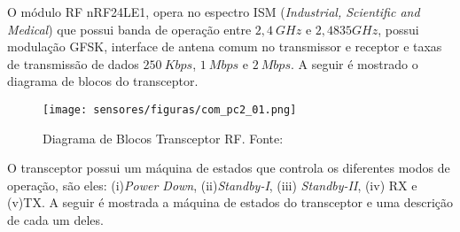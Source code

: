 O módulo RF nRF24LE1, opera no espectro ISM (\emph{Industrial, Scientific and Medical}) que possui banda de operação entre $2,4~GHz$ e $2,4835GHz$, possui modulação GFSK, interface de antena comum no transmissor e receptor e taxas de transmissão de dados $250~Kbps$, $1~Mbps$ e $2~Mbps$. A seguir é mostrado o diagrama de blocos do transceptor.

\begin{figure}[H]
\centering
	\label{com_pc2_01}
	\texttt{[image: sensores/figuras/com\_pc2\_01.png]}
   \caption{Diagrama de Blocos Transceptor RF. Fonte: \cite{bib_com_01_yas}}
\end{figure}

O transceptor possui um máquina de estados que controla os diferentes modos de operação, são eles:  (i)\emph{Power Down}, (ii)\emph{Standby-I}, (iii) \emph{Standby-II}, (iv) RX e (v)TX. A seguir é mostrada a máquina de estados do transceptor e uma descrição de cada um deles. 


